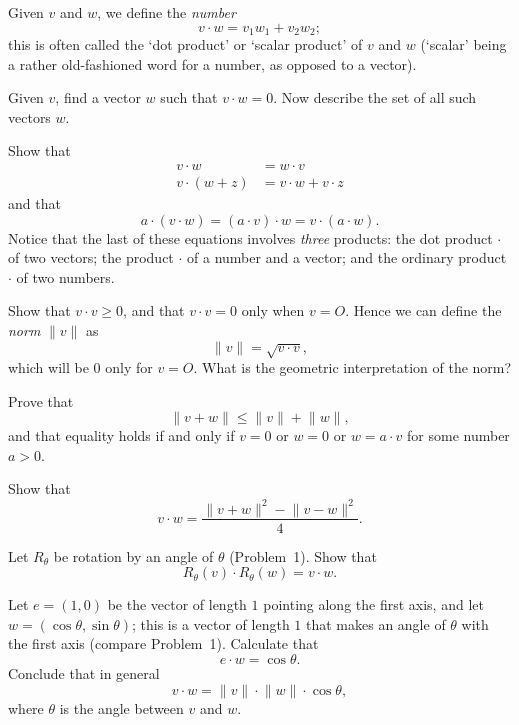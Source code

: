  Given $v$ and $w$, we define the \emph{number}
\[
v\cdot w=v_1w_1+v_2w_2;
\]
this is often called the `dot product' or `scalar product' of $v$ and $w$
(`scalar' being a rather old-fashioned word for a number, as opposed to a
vector).
\begin{letters}
\item Given $v$, find a vector $w$ such that $v\cdot w=0$. Now describe the set
  of all such vectors $w$.
\item Show that
  \begin{align*}
  v\cdot w&=w\cdot v\\
  v\cdot(w+z)&=v\cdot w+v\cdot z
  \end{align*}
  and that
  \[
  a\cdot(v\cdot w)=(a\cdot v)\cdot w=v\cdot(a\cdot w).
  \]
  Notice that the last of these equations involves \emph{three} products: the
  dot product $\cdot$ of two vectors; the product $\cdot$ of a number and a
  vector; and the ordinary product $\cdot$ of two numbers.
\item Show that $v\cdot v\geq 0$, and that $v\cdot v=0$ only when $v=O$. Hence
  we can define the \emph{norm} $\lVert v\rVert$ as
  \[
  \lVert v\rVert=\sqrt{v\cdot v},
  \]
  which will be $0$ only for $v=O$. What is the geometric interpretation of the
  norm?
\item Prove that
  \[
  \lVert v+w\rVert\leq\lVert v\rVert+\lVert w\rVert,
  \]
  and that equality holds if and only if $v=0$ or $w=0$ or $w=a\cdot v$ for
  some number $a>0$.
\item Show that
  \[
  v\cdot w=\frac{\lVert v+w\rVert^2-\lVert v-w\rVert^2}{4}.
  \]
\end{letters}

\begin{letters}
\item Let $R_{\theta}$ be rotation by an angle of $\theta$ (Problem~1). Show
  that
  \[
  R_{\theta}(v)\cdot R_{\theta}(w)=v\cdot w.
  \]
\item Let $e=(1,0)$ be the vector of length $1$ pointing along the first axis,
  and let $w=(\cos\theta,\sin\theta)$; this is a vector of length $1$ that makes
  an angle of $\theta$ with the first axis (compare Problem~1). Calculate that
  \[
  e\cdot w=\cos\theta.
  \]
  Conclude that in general
  \[
  v\cdot w=\lVert v\rVert\cdot\lVert w\rVert\cdot\cos\theta,
  \]
  where $\theta$ is the angle between $v$ and $w$.
\end{letters}

